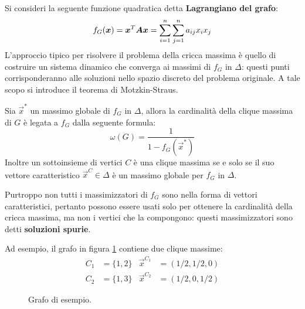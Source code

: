 \noindent Si consideri la seguente funzione quadratica detta \textbf{Lagrangiano del grafo}:
\begin{displaymath}
	f_G(\vec{x}) = \vec{x}^T \mat{A} \vec{x} = \sum_{i=1}^n \sum_{j=1}^n a_{ij} x_i x_j
\end{displaymath}
L'approccio tipico per risolvere il problema della cricca massima è quello di costruire un sistema dinamico che converga ai massimi di $f_G$ in $\Delta$: questi punti corrisponderanno alle soluzioni nello spazio discreto del problema originale. A tale scopo si introduce il teorema di Motzkin-Straus.
\begin{thm}
	Sia $\vec{x}^*$ un massimo globale di $f_G$ in $\Delta$, allora la cardinalità della clique massima di $G$ è legata a $f_G$ dalla seguente formula:
	\begin{displaymath}
		\omega(G) = \frac{1}{1 - f_G(\vec{x}^*)}
	\end{displaymath}
	Inoltre un sottoinsieme di vertici $C$ è una clique massima se e solo se il suo vettore caratteristico $\vec{x}^C \in \Delta$ è un massimo globale per $f_G$ in $\Delta$.
\end{thm} 
\noindent Purtroppo non tutti i massimizzatori di $f_G$ sono nella forma di vettori caratteristici, pertanto possono essere usati solo per ottenere la cardinalità della cricca massima, ma non i vertici che la compongono: questi massimizzatori sono detti \textbf{soluzioni spurie}.

Ad esempio, il grafo in figura \ref{fig:grafoesempio} contiene due clique massime:
\begin{align*}
	C_1 &= \{1,2\} & \vec{x}^{C_1} &= (1 / 2, 1 / 2, 0) \\
	C_2 &= \{1,3\} & \vec{x}^{C_2} &= (1 / 2, 0, 1 / 2)
\end{align*}

\begin{figure}[h!]
	\centering
	\caption{Grafo di esempio.}
	\label{fig:grafoesempio}
\end{figure}

